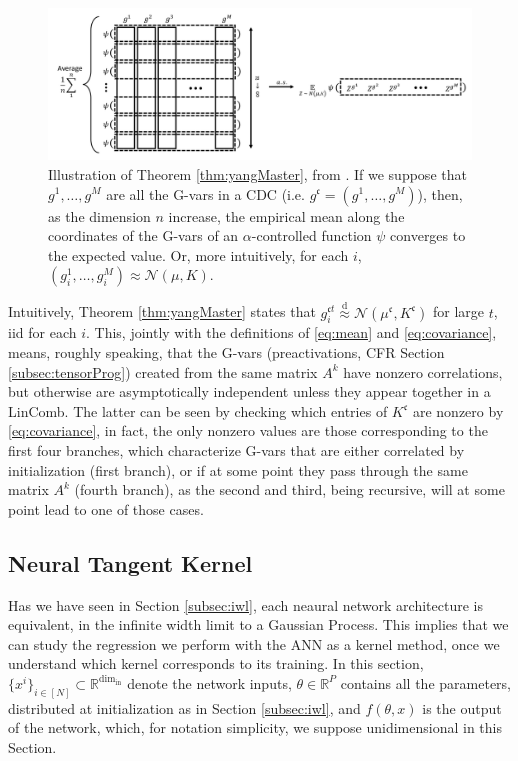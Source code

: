 \documentclass[11pt,notitlepage]{article}
\numberwithin{equation}{section}
\def\R{{\mathbb{R}}}
\def\normdist{\mathcal{N}}
\theoremstyle{remark}
\theoremstyle{definition}
\begin{document}
	\begin{figure}[h!]
	\centering
	\includegraphics[width=\linewidth]{Figures/NETSOR_master_thm1.png}
	\caption{Illustration of Theorem \ref{thm:yangMaster}, from \cite{yang2019tensor}. If we suppose that $g^1, \dots, g^M$ are all the G-vars in a CDC (i.e. $g^{\mathfrak{c}} = (g^1, \dots, g^M)$), then, as the dimension $n$ increase, the empirical mean along the coordinates of the G-vars of an $\alpha$-controlled function $\psi$ converges to the expected value.
		Or, more intuitively, for each $i$, $(g^1_i, \dots, g^M_i) \approx \normdist(\mu, K)$.
	}
	\end{figure} 
	
	Intuitively, Theorem \ref{thm:yangMaster} states that $g_i^{\mathfrak{c}t} \stackrel{\text{d}}{\approx} \normdist(\mu^\mathfrak{c}, K^\mathfrak{c})$ for large $t$, iid for each $i$.
	This, jointly with the definitions of \eqref{eq:mean} and \eqref{eq:covariance}, means, roughly speaking, that the G-vars (preactivations, CFR Section \ref{subsec:tensorProg}) created from the same matrix $A^k$ have nonzero correlations, but otherwise are asymptotically independent unless they appear together in a LinComb.
	The latter can be seen by checking which entries of $K^\mathfrak{c}$ are nonzero by \eqref{eq:covariance}, in fact, the only nonzero values are those corresponding to the first four branches, which characterize G-vars that are either correlated by initialization (first branch), or if at some point they pass through the same matrix $A^k$ (fourth branch), as the second and third, being recursive, will at some point lead to one of those cases.
	
	\subsection{Neural Tangent Kernel}\label{subsec:ntk}
	
	Has we have seen in Section \ref{subsec:iwl}, each neaural network architecture is equivalent, in the infinite width limit to a Gaussian Process.
	This implies that we can study the regression we perform with the ANN as a kernel method, once we understand which kernel corresponds to its training.
	In this section, $\{x^i\}_{i\in [N]} \subset \R^{\text{dim}_\text{in}}$ denote the network inputs, $\theta \in \R^P$ contains all the parameters, distributed at initialization as in Section \ref{subsec:iwl}, and $f(\theta, x)$ is the output of the network, which, for notation simplicity, we suppose unidimensional in this Section.
	
\end{document}

